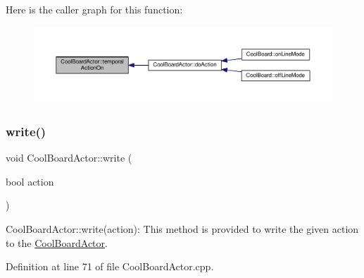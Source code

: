 Here is the caller graph for this function\+:\nopagebreak
\begin{figure}[H]
\begin{center}
\leavevmode
\includegraphics[width=350pt]{dc/d69/class_cool_board_actor_ada603785c203fdb0b41cc967d70bdc4d_icgraph}
\end{center}
\end{figure}
\mbox{\label{class_cool_board_actor_a958786ff01ea1056ee72c72d439f86da}} 
\subsubsection{\texorpdfstring{write()}{write()}}
{\footnotesize\ttfamily void Cool\+Board\+Actor\+::write (\begin{DoxyParamCaption}\item[{bool}]{action }\end{DoxyParamCaption})}

Cool\+Board\+Actor\+::write(action)\+: This method is provided to write the given action to the \hyperlink{class_cool_board_actor}{Cool\+Board\+Actor}. 

Definition at line 71 of file Cool\+Board\+Actor.\+cpp.


